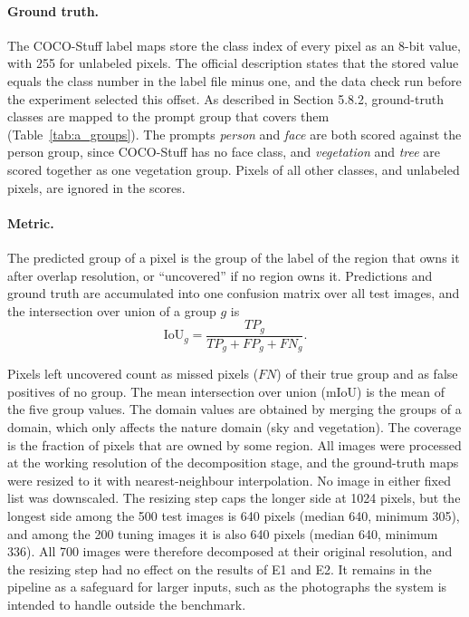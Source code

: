 \documentclass{FastFyp}
\begin{document}
\paragraph{Ground truth.} The COCO-Stuff label maps store the class index of every pixel as an 8-bit value, with 255 for unlabeled pixels. The official description states that the stored value equals the class number in the label file minus one, and the data check run before the experiment selected this offset. As described in Section 5.8.2, ground-truth classes are mapped to the prompt group that covers them (Table~\ref{tab:a_groups}). The prompts \textit{person} and \textit{face} are both scored against the person group, since COCO-Stuff has no face class, and \textit{vegetation} and \textit{tree} are scored together as one vegetation group. Pixels of all other classes, and unlabeled pixels, are ignored in the scores.
 
\paragraph{Metric.} The predicted group of a pixel is the group of the label of the region that owns it after overlap resolution, or ``uncovered'' if no region owns it. Predictions and ground truth are accumulated into one confusion matrix over all test images, and the intersection over union of a group $g$ is
\begin{equation}
\mathrm{IoU}_g=\frac{TP_g}{TP_g+FP_g+FN_g}.
\label{eq:a_iou}
\end{equation}

Pixels left uncovered count as missed pixels ($FN$) of their true group and as false positives of no group. The mean intersection over union (mIoU) is the mean of the five group values. The domain values are obtained by merging the groups of a domain, which only affects the nature domain (sky and vegetation). The coverage is the fraction of pixels that are owned by some region. All images were processed at the working resolution of the decomposition stage, and the ground-truth maps were resized to it with nearest-neighbour interpolation. No image in either fixed list was downscaled. The resizing step caps the longer side at 1024 pixels, but the longest side among the 500 test images is 640 pixels (median 640, minimum 305), and among the 200 tuning images it is also 640 pixels (median 640, minimum 336). All 700 images were therefore decomposed at their original resolution, and the resizing step had no effect on the results of E1 and E2. It remains in the pipeline as a safeguard for larger inputs, such as the photographs the system is intended to handle outside the benchmark.
 
\end{document}
